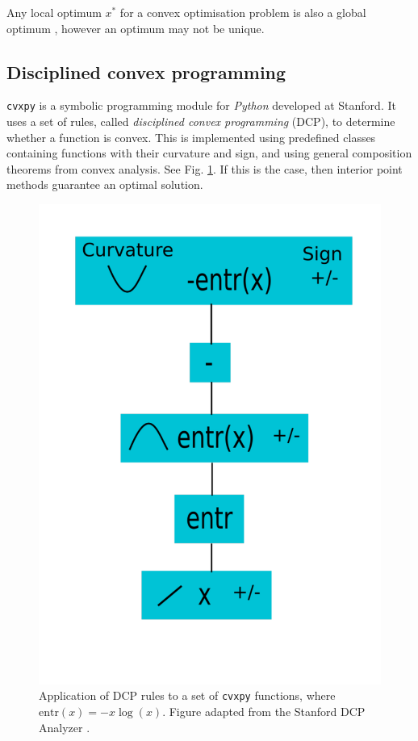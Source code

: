 \documentclass[twocolumn,secnumarabic,amssymb, nobibnotes, aps, prl,superscriptaddress]{revtex4-1}
\begin{document}
Any local optimum $x^*$ for a convex optimisation problem is also a global optimum \cite[pp.138-139]{cvxpybook}, however an optimum may not be unique.

\subsection{Disciplined convex programming}
\texttt{cvxpy} is a symbolic programming module for \textit{Python} developed at Stanford\cite{cvxpy}. It uses a set of rules, called \textit{disciplined convex programming} (DCP), to determine whether a function is convex. This is implemented using predefined classes containing functions with their curvature and sign, and using general composition theorems from convex analysis. See Fig. \ref{fig:DCP}.  If this is the case, then interior point methods guarantee an optimal solution.

\begin{figure}
\includegraphics[width=0.7\linewidth]{DCP.pdf}
\caption{\label{fig:DCP}Application of DCP rules to a set of \texttt{cvxpy} functions, where $\text{entr}(x)=-x\log(x)$.  Figure adapted from the Stanford DCP Analyzer \cite{dcp}.}
\end{figure}
\end{document}
